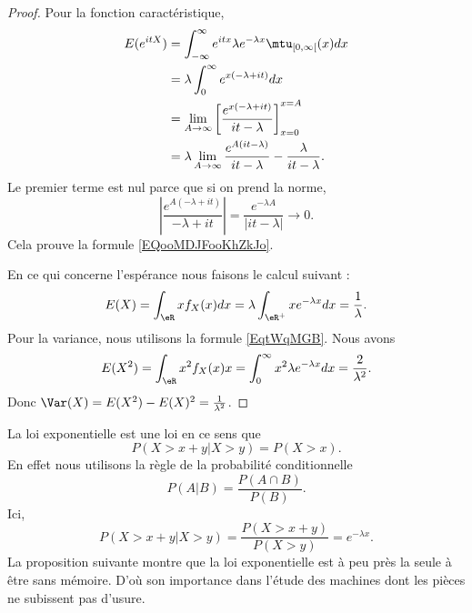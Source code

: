\begin{proof}
	Pour la fonction caractéristique,
	\begin{subequations}
		\begin{align}
			E( e^{itX}) & =\int_{-\infty}^{\infty} e^{it x}\lambda e^{-\lambda x}\mtu_{\mathopen\lbrack 0 , \infty \lbrack}(x)dx \\
			            & =\lambda\int_0^{\infty} e^{x(-\lambda+it)}dx                                                           \\
			            & =\lim_{A\to\infty}\left[  \frac{  e^{x(-\lambda+it)} }{ it-\lambda } \right]_{x=0}^{x=A}               \\
			            & =\lambda\lim_{A\to \infty}\frac{  e^{A(it-\lambda)} }{ it-\lambda }-\frac{\lambda}{ it-\lambda }.
		\end{align}
	\end{subequations}
	Le premier terme est nul parce que si on prend la norme,
	\begin{equation}
		\left| \frac{  e^{A(-\lambda+it)} }{ -\lambda+it } \right| =\frac{  e^{-\lambda A} }{ | it-\lambda | }\to 0.
	\end{equation}
	Cela prouve la formule \eqref{EQooMDJFooKhZkJo}.

	En ce qui concerne l'espérance nous faisons le calcul suivant :
	\begin{equation}
		E(X)=\int_{\eR}xf_X(x)dx=\lambda\int_{\eR^+}x e^{-\lambda x}dx=\frac{1}{ \lambda }.
	\end{equation}
	Pour la variance, nous utilisons la formule \eqref{EqtWqMGB}. Nous avons
	\begin{equation}
		E(X^2)=\int_{\eR}x^2f_X(x)x=\int_0^{\infty}x^2\lambda e^{-\lambda x}dx=\frac{ 2 }{ \lambda^2 }.
	\end{equation}
	Donc \( \Var(X)=E(X^2)-E(X)^2=\frac{1}{ \lambda^2 }\).
\end{proof}

La loi exponentielle est une loi  en ce sens que
\begin{equation}
	P(X>x+y|X>y)=P(X>x).
\end{equation}
En effet nous utilisons la règle de la probabilité conditionnelle
\begin{equation}
	P(A|B)=\frac{ P(A\cap B) }{ P(B) }.
\end{equation}
Ici,
\begin{equation}
	P(X>x+y|X>y)=\frac{ P(X>x+y) }{ P(X>y) }= e^{-\lambda x}.
\end{equation}
La proposition suivante montre que la loi exponentielle est à peu près la seule à être sans mémoire. D'où son importance dans l'étude des machines dont les pièces ne subissent pas d'usure.

